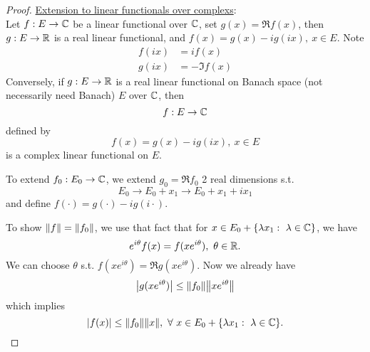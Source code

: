 \begin{proof}
\np \underline{Extension to linear functionals over complexs}:\\
Let $f: E \to \mathbb{C}$ be a linear functional over $\mathbb{C}$, set $g(x) = \Re{f(x)}$, then $g: E \to \mathbb{R}$ is a real linear functional, and $f(x) = g(x) - i g(ix),\ x \in E$. Note
\begin{align*}
    f(ix) &= i f(x)\\
    g(ix) &= - \Im{f(x)}
\end{align*}
Conversely, if $g: E \to \mathbb{R}$ is a real linear functional on Banach space (not necessarily need Banach) $E$ over $\mathbb{C}$, then
\begin{equation*}
    f : E \to \mathbb{C}
\end{equation*}
defined by
\begin{equation*}
    f(x) = g(x) - i g(ix),\ x \in E
\end{equation*}
is a complex linear functional on $E$.

\np To extend $f_0: E_0 \to \mathbb{C}$, we extend $g_0 = \Re{f_0}$ 2 real dimensions s.t.
\begin{equation*}
    E_0 \to E_0 + x_1 \to E_0 + x_1 + i x_1
\end{equation*}
and define $f(\cdot) = g(\cdot) - i g(i \cdot)$.

\np To show $\norm{f} = \norm{f_0}$, we use that fact that for $x \in E_0 + \{\lambda x_1:\ \lambda \in \mathbb{C}\}$, we have
\begin{equation*}
    e^{i \theta} f(x) = f(x e^{i\theta}),\ \theta \in \mathbb{R}.
\end{equation*}
We can choose $\theta$ s.t. $f(x e^{i\theta}) = \Re{g(x e^{i \theta})}$. Now we already have
\begin{equation*}
    \abs{g(x e^{i \theta})} \leq \norm{f_0} \norm{x e^{i \theta}}
\end{equation*}
which implies 
\begin{equation*}
    \abs{f(x)} \leq \norm{f_0} \norm{x},\ \forall\ x \in E_0 + \{\lambda x_1:\ \lambda \in \mathbb{C}\}.
\end{equation*}
\end{proof}







\vspace{12pt}
